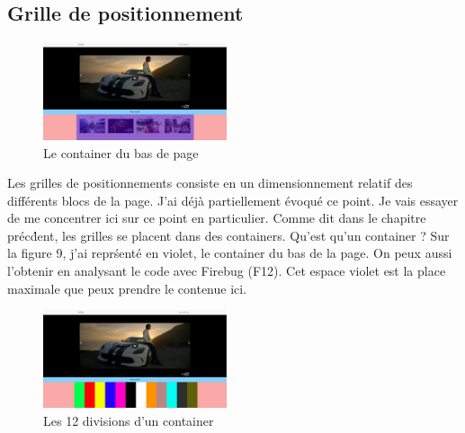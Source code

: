 \documentclass{article}
\begin{document}
\subsection{Grille de positionnement}

\begin{figure}
  \vspace{-25pt}
  \begin{center}
    \includegraphics[width=0.48\textwidth]{p10}
  \end{center}
  \vspace{-20pt}
  \caption{Le container du bas de page}
  \vspace{-10pt}
\end{figure} 

Les grilles de positionnements consiste en un dimensionnement relatif des diff\'erents blocs de la page. J'ai d\'ej\`a partiellement \'evoqu\'e ce point. Je vais essayer de me concentrer ici sur ce point en particulier. Comme dit dans le chapitre pr\'ec\'dent, les grilles se placent dans des containers. Qu'est qu'un container ? Sur la figure 9, j'ai repr\'sent\'e en violet, le container du bas de la page. On peux aussi l'obtenir en analysant le code avec Firebug (F12). Cet espace violet est la place maximale que peux prendre le contenue ici.\\

\begin{figure}
  \vspace{-25pt}
  \begin{center}
    \includegraphics[width=0.48\textwidth]{p12}
  \end{center}
  \vspace{-20pt}
  \caption{Les 12 divisions d'un container}
  \vspace{-10pt}
\end{figure} 
\end{document}
